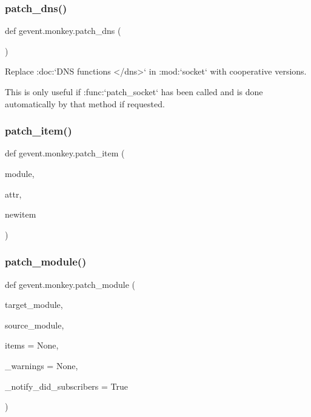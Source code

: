 \subsubsection{\texorpdfstring{patch\+\_\+dns()}{patch\_dns()}}
{\footnotesize\ttfamily def gevent.\+monkey.\+patch\+\_\+dns (\begin{DoxyParamCaption}{ }\end{DoxyParamCaption})}

\begin{DoxyVerb}Replace :doc:`DNS functions </dns>` in :mod:`socket` with
cooperative versions.

This is only useful if :func:`patch_socket` has been called and is
done automatically by that method if requested.
\end{DoxyVerb}
 \mbox{\label{namespacegevent_1_1monkey_a427173356bbfbfe80987e3b28e4b1b58}} 
\subsubsection{\texorpdfstring{patch\+\_\+item()}{patch\_item()}}
{\footnotesize\ttfamily def gevent.\+monkey.\+patch\+\_\+item (\begin{DoxyParamCaption}\item[{}]{module,  }\item[{}]{attr,  }\item[{}]{newitem }\end{DoxyParamCaption})}

\mbox{\label{namespacegevent_1_1monkey_ad3b37abeb612c38561500a824c0e7f1c}} 
\subsubsection{\texorpdfstring{patch\+\_\+module()}{patch\_module()}}
{\footnotesize\ttfamily def gevent.\+monkey.\+patch\+\_\+module (\begin{DoxyParamCaption}\item[{}]{target\+\_\+module,  }\item[{}]{source\+\_\+module,  }\item[{}]{items = {\ttfamily None},  }\item[{}]{\+\_\+warnings = {\ttfamily None},  }\item[{}]{\+\_\+notify\+\_\+did\+\_\+subscribers = {\ttfamily True} }\end{DoxyParamCaption})}

